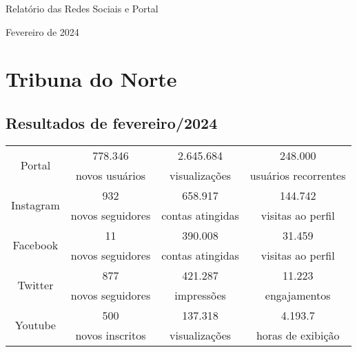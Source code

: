 \documentclass{article}%
\begin{document}
%
\normalsize%
\begin{minipage}{\textwidth}%
\centering%
\begin{Large}%
Relatório das Redes Sociais e Portal%
\end{Large}%
\linebreak%
\linebreak%
\linebreak%
\begin{large}%
Fevereiro de 2024%
\end{large}%
\linebreak%
\end{minipage}%
\section*{Tribuna do Norte}%
\label{sec:TribunadoNorte}%
\subsection*{Resultados de fevereiro/2024}%
\label{subsec:Resultadosdefevereiro/2024}%
\begin{minipage}{\textwidth}%
\centering%
\begin{tabular}{@{}|c|c|c|c|@{}}%
\toprule%
\multirow{2}{*}{Portal}&778.346&2.645.684&248.000\\%
&novos usuários&visualizações&usuários recorrentes\\%
\midrule%
\multirow{2}{*}{Instagram}&932&658.917&144.742\\%
&novos seguidores&contas atingidas&visitas ao perfil\\%
\midrule%
\multirow{2}{*}{Facebook}&11&390.008&31.459\\%
&novos seguidores&contas atingidas&visitas ao perfil\\%
\midrule%
\multirow{2}{*}{Twitter}&877&421.287&11.223\\%
&novos seguidores&impressões&engajamentos\\%
\midrule%
\multirow{2}{*}{Youtube}&500&137.318&4.193.7\\%
&novos inscritos&visualizações&horas de exibição\\\bottomrule%
%
\end{tabular}%
\end{minipage}%
\end{document}
